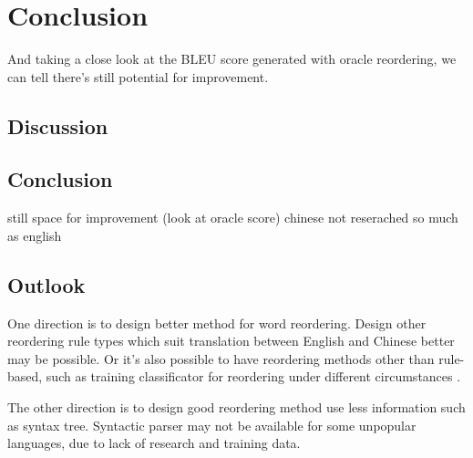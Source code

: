 

\chapter{Conclusion}
\label{ch:Conclusion}
And taking a close look at the BLEU score generated with oracle reordering, we can tell there's still potential for improvement.

\section{Discussion}
\label{ch:Conclusion:sec:Discussion}


\section{Conclusion}
\label{ch:Conclusion:sec:Conclusion}


still space for improvement (look at oracle score)
chinese not reserached so much as english
\section{Outlook}
\label{ch:Conclusion:sec:Outlook}

One direction is to design better method for word reordering. Design other reordering rule types which suit translation between English and Chinese better may be possible. Or it's also possible to have reordering methods other than rule-based, such as training classificator for reordering under different circumstances \citep{google}.

The other direction is to design good reordering method use less information such as syntax tree. Syntactic parser may not be available for some unpopular languages, due to lack of research and training data.


